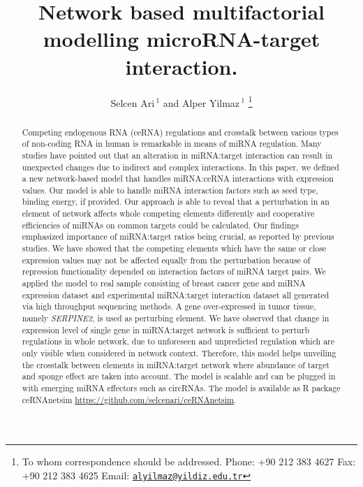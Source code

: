 \documentclass[a4,center,fleqn]{NAR}
\begin{document}
\title{Network based multifactorial modelling microRNA-target interaction.}

\author{
    Selcen Ari\,$^{1}$
   and Alper Yilmaz\,$^{1}$ \footnote{To whom correspondence should be addressed. Phone: +90 212 383 4627 Fax:
+90 212 383 4625 Email:
\href{mailto:alyilmaz@yildiz.edu.tr}{\nolinkurl{alyilmaz@yildiz.edu.tr}}} 
}
        

\address{
   $^{1}$ Department of Bioengineering, Yildiz Technical University, Istanbul,
Turkey 
}



\maketitle

\begin{abstract}
Competing endogenous RNA (ceRNA) regulations and crosstalk between
various types of non-coding RNA in human is remarkable in means of miRNA
regulation. Many studies have pointed out that an alteration in
miRNA:target interaction can result in unexpected changes due to
indirect and complex interactions. In this paper, we defined a new
network-based model that handles miRNA:ceRNA interactions with
expression values. Our model is able to handle miRNA interaction factors
such as seed type, binding energy, if provided. Our approach is able to
reveal that a perturbation in an element of network affects whole
competing elements differently and cooperative efficiencies of miRNAs on
common targets could be calculated. Our findings emphasized importance
of miRNA:target ratios being crucial, as reported by previous studies.
We have showed that the competing elements which have the same or close
expression values may not be affected equally from the perturbation
because of repression functionality depended on interaction factors of
miRNA target pairs. We applied the model to real sample consisting of
breast cancer gene and miRNA expression dataset and experimental
miRNA:target interaction dataset all generated via high throughput
sequencing methods. A gene over-expressed in tumor tissue, namely
\emph{SERPINE2}, is used as perturbing element. We have observed that
change in expression level of single gene in miRNA:target network is
sufficient to perturb regulations in whole network, due to unforeseen
and unpredicted regulation which are only visible when considered in
network context. Therefore, this model helps unveiling the crosstalk
between elements in miRNA:target network where abundance of target and
sponge effect are taken into account. The model is scalable and can be
plugged in with emerging miRNA effectors such as circRNAs. The model is
available as R package ceRNAnetsim
\url{https://github.com/selcenari/ceRNAnetsim}.
\end{abstract}
\end{document}
